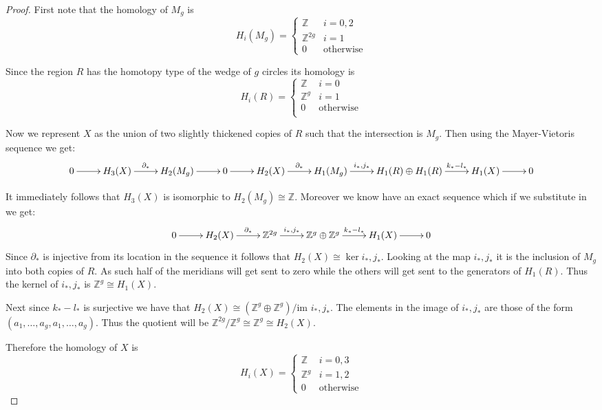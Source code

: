 \documentclass[10pt]{article}
\newcommand{\bb}[1]{\mathbb{#1}}
\theoremstyle{plain}
\theoremstyle{remark}
\begin{document}
\begin{proof}
  First note that the homology of $M_g$ is
  \[
    H_i(M_g) = 
    \left\{
      \begin{array}{cr}
        \bb{Z} & i=0,2\\
        \bb{Z}^{2g} & i=1\\
        0 & \text{otherwise}
      \end{array}
    \right.
  \]

  Since the region $R$ has the homotopy type of the wedge of $g$ circles
  its homology is
  \[
    H_i(R) = 
    \left\{
      \begin{array}{cr}
        \bb{Z} & i=0\\
        \bb{Z}^g & i=1\\
        0 & \text{otherwise}\\
      \end{array}
    \right.
  \]

  Now we represent $X$ as the union of two slightly thickened copies
  of $R$ such that the intersection is $M_g$. Then using the Mayer-Vietoris
  sequence we get:
  \[
    \xymatrix{
      0 \ar[r] & H_3(X) \ar[r]^-{\partial_*} & H_2(M_g) \ar[r] & 0 \ar[r] & H_2(X) \ar[r]^-{\partial_*} & H_1(M_g) \ar[r]^-{i_*,j_*} & H_1(R)\oplus H_1(R) \ar[r]^-{k_*-l_*} & H_1(X) \ar[r] & 0
    }
  \]

  It immediately follows that $H_3(X)$ is isomorphic to $H_2(M_g)\cong \bb{Z}$. Moreover we know
  have an exact sequence which if we substitute in we get:
  \[
    \xymatrix{
      0 \ar[r] & H_2(X) \ar[r]^-{\partial_*} & \bb{Z}^{2g} \ar[r]^-{i_*,j_*} & \bb{Z}^g \oplus \bb{Z}^g \ar[r]^-{k_*-l_*} & H_1(X) \ar[r] & 0
    }
  \]
  Since $\partial_*$ is injective from its location in the sequence it follows that
  $H_2(X)\cong\ker i_*,j_*$. Looking at the map $i_*,j_*$ it is the inclusion of $M_g$ into both
  copies of $R$. As such half of the meridians will get sent to zero while the others will
  get sent to the generators of $H_1(R)$. Thus the kernel of $i_*,j_*$ is $\bb{Z}^g\cong H_1(X)$.

  Next since $k_*-l_*$ is surjective we have that $H_2(X)\cong(\bb{Z}^g\oplus\bb{Z}^g)/\text{im\ }i_*,j_*$.
  The elements in the image of $i_*,j_*$ are those of the form $(a_1,\ldots,a_g,a_1,\ldots,a_g)$.
  Thus the quotient will be $\bb{Z}^{2g}/\bb{Z}^g\cong\bb{Z}^g\cong H_2(X)$.

  Therefore the homology of $X$ is
  \[
    H_i(X) = 
    \left\{
      \begin{array}{cr}
        \bb{Z} & i=0,3\\
        \bb{Z}^g & i=1,2\\
        0 & \text{otherwise}
      \end{array}
    \right.
  \]


\end{proof}
\end{document}
